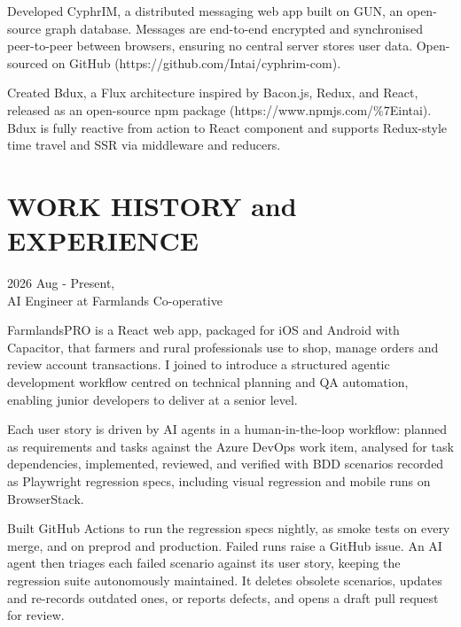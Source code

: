 \begin{resume}
Developed CyphrIM, a distributed messaging web app built on GUN, an open-source graph database. Messages are end-to-end encrypted and synchronised peer-to-peer between browsers, ensuring no central server stores user data. Open-sourced on GitHub (https://github.com/Intai/cyphrim-com).

Created Bdux, a Flux architecture inspired by Bacon.js, Redux, and React, released as an open-source npm package (https://www.npmjs.com/\%7Eintai). Bdux is fully reactive from action to React component and supports Redux-style time travel and SSR via middleware and reducers.

\begin{minipage}{\textwidth}
\vspace{0.03in}
\section{WORK HISTORY and EXPERIENCE} 
\vspace{0.165in}

\hspace*{-0.25in} 2026 Aug - Present,\\
\hspace*{-0.25in} AI Engineer at Farmlands Co-operative
\vspace{0.165in}

FarmlandsPRO is a React web app, packaged for iOS and Android with Capacitor, that farmers and rural professionals use to shop, manage orders and review account transactions. I joined to introduce a structured agentic development workflow centred on technical planning and QA automation, enabling junior developers to deliver at a senior level.
\end{minipage}

Each user story is driven by AI agents in a human-in-the-loop workflow: planned as requirements and tasks against the Azure DevOps work item, analysed for task dependencies, implemented, reviewed, and verified with BDD scenarios recorded as Playwright regression specs, including visual regression and mobile runs on BrowserStack.

Built GitHub Actions to run the regression specs nightly, as smoke tests on every merge, and on preprod and production. Failed runs raise a GitHub issue. An AI agent then triages each failed scenario against its user story, keeping the regression suite autonomously maintained. It deletes obsolete scenarios, updates and re-records outdated ones, or reports defects, and opens a draft pull request for review.


\end{resume}
